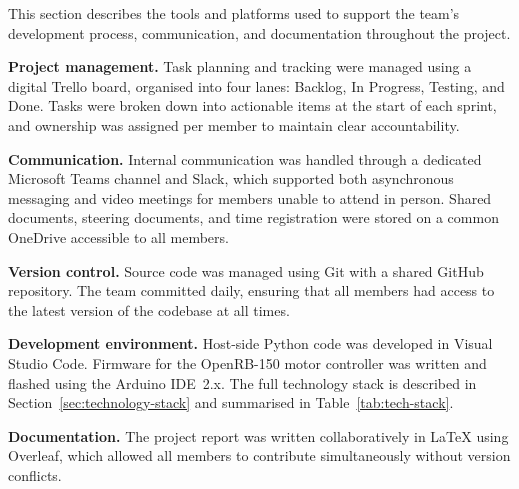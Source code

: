 \label{sec:tools-workflow}

This section describes the tools and platforms used to support the team's
development process, communication, and documentation throughout the project.

\textbf{Project management.} Task planning and tracking were managed using a
digital Trello board, organised into four lanes: Backlog, In Progress, Testing,
and Done. Tasks were broken down into actionable items at the start of each sprint,
and ownership was assigned per member to maintain clear accountability.

\textbf{Communication.} Internal communication was handled through a dedicated
Microsoft Teams channel and Slack, which supported both asynchronous messaging and
video meetings for members unable to attend in person. Shared documents, steering
documents, and time registration were stored on a common OneDrive accessible to
all members.

\textbf{Version control.} Source code was managed using Git with a shared GitHub
repository. The team committed daily, ensuring that all members had access to the
latest version of the codebase at all times.

\textbf{Development environment.} Host-side Python code was developed in Visual
Studio Code. Firmware for the OpenRB-150 motor controller was written and flashed
using the Arduino IDE~2.x. The full technology stack is described in
Section~\ref{sec:technology-stack} and summarised in Table~\ref{tab:tech-stack}.

\textbf{Documentation.} The project report was written collaboratively in
\LaTeX{} using Overleaf, which allowed all members to contribute simultaneously
without version conflicts.

